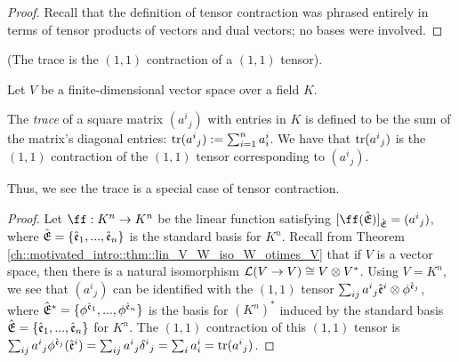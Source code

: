 \begin{proof}
    Recall that the definition of tensor contraction was phrased entirely in terms of tensor products of vectors and dual vectors; no bases were involved.
\end{proof}

\begin{theorem}
    (The trace is the $(1, 1)$ contraction of a $(1, 1)$ tensor).
    
    Let $V$ be a finite-dimensional vector space over a field $K$.
    
    The \textit{trace} of a square matrix $(a^i{}_j)$ with entries in $K$ is defined to be the sum of the matrix's diagonal entries: $\text{tr}(a^i{}_j) := \sum_{i = 1}^n a^i_i$. We have that $\text{tr}(a^i{}_j)$ is the $(1, 1)$ contraction of the $(1, 1)$ tensor corresponding to $(a^i{}_j)$.
    
    Thus, we see the trace is a special case of tensor contraction.
\end{theorem}

\begin{proof}
    Let $\ff:K^n \rightarrow K^n$ be the linear function satisfying $[\ff(\sE)]_\sE = (a^i{}_j)$, where ${\hat{\mathfrak{E}}} = \{\hat{\mathfrak{e}}_1, ..., \hat{\mathfrak{e}}_n\}$ is the standard basis for $K^n$. Recall from Theorem \ref{ch::motivated_intro::thm::lin_V_W_iso_W_otimes_V} that if $V$ is a vector space, then there is a natural isomorphism $\mathcal{L}(V \rightarrow V) \cong V \otimes V^*$. Using $V = K^n$, we see that $(a^i{}_j)$ can be identified with the $(1, 1)$ tensor $\sum_{ij} a^i{}_j \hat{\mathfrak{e}}^i \otimes \phi^{\hat{\mathfrak{e}}_j}$, where ${\hat{\mathfrak{E}}}^* = \{\phi^{\hat{\mathfrak{e}}_1}, ..., \phi^{\hat{\mathfrak{e}}_n}\}$ is the basis for $(K^n)^*$ induced by the standard basis ${\hat{\mathfrak{E}}} = \{\hat{\mathfrak{e}}_1, ..., \hat{\mathfrak{e}}_n\}$ for $K^n$. The $(1, 1)$ contraction of this $(1, 1)$ tensor is $\sum_{ij} a^i{}_j \phi^{\hat{\mathfrak{e}}_j}(\hat{\mathfrak{e}}^i) = \sum_{ij} a^i{}_j \delta^i{}_j = \sum_i a^i_i = \text{tr}(a^i{}_j)$. 
\end{proof}
